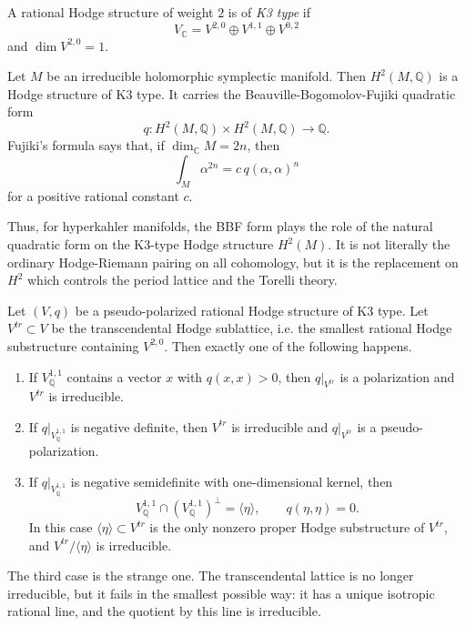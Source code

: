 \begin{definition}
\label{definition-k3-type-hodge-structure}
A rational Hodge structure of weight $2$
is of {\it K3 type} if
$$
V_{\mathbb{C}}=
V^{2,0}\oplus V^{1,1}\oplus V^{0,2}
$$
and $\dim V^{2,0}=1$.
\end{definition}

\begin{example}
\label{example-bbf-k3-type}
Let $M$ be an irreducible holomorphic
symplectic manifold.
Then $H^2(M,\mathbb{Q})$ is a Hodge
structure of K3 type.
It carries the Beauville-Bogomolov-Fujiki
quadratic form
$$
q:H^2(M,\mathbb{Q})\times H^2(M,\mathbb{Q})
\longrightarrow \mathbb{Q}.
$$
Fujiki's formula says that, if
$\dim_{\mathbb{C}}M=2n$, then
$$
\int_M\alpha^{2n}=c\,q(\alpha,\alpha)^n
$$
for a positive rational constant $c$.
\end{example}

\noindent
Thus, for hyperkahler manifolds, the BBF
form plays the role of the natural quadratic
form on the K3-type Hodge structure
$H^2(M)$.
It is not literally the ordinary
Hodge-Riemann pairing on all cohomology, but
it is the replacement on $H^2$ which controls
the period lattice and the Torelli theory.

\begin{theorem}
\label{theorem-transcendental-k3-type}
Let $(V,q)$ be a pseudo-polarized rational
Hodge structure of K3 type.
Let $V^{tr}\subset V$ be the transcendental
Hodge sublattice, i.e. the smallest rational
Hodge substructure containing $V^{2,0}$.
Then exactly one of the following happens.
\begin{enumerate}
\item If $V^{1,1}_{\mathbb{Q}}$ contains a
vector $x$ with $q(x,x)>0$, then
$q|_{V^{tr}}$ is a polarization and
$V^{tr}$ is irreducible.
\item If $q|_{V^{1,1}_{\mathbb{Q}}}$ is
negative definite, then $V^{tr}$ is
irreducible and
$q|_{V^{tr}}$ is a pseudo-polarization.
\item If $q|_{V^{1,1}_{\mathbb{Q}}}$ is
negative semidefinite with one-dimensional
kernel, then
$$
V^{1,1}_{\mathbb{Q}}\cap
(V^{1,1}_{\mathbb{Q}})^\perp
=\langle\eta\rangle,
\qquad q(\eta,\eta)=0.
$$
In this case $\langle\eta\rangle\subset
V^{tr}$ is the only nonzero proper Hodge
substructure of $V^{tr}$, and
$V^{tr}/\langle\eta\rangle$ is irreducible.
\end{enumerate}
\end{theorem}

\noindent
The third case is the strange one.
The transcendental lattice is no longer
irreducible, but it fails in the smallest
possible way: it has a unique isotropic
rational line, and the quotient by this line
is irreducible.

